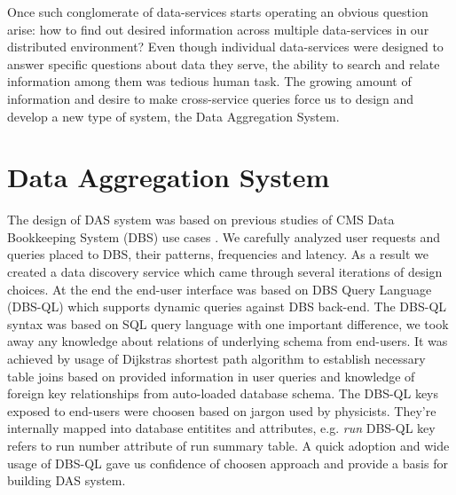 \documentclass[a4paper]{jpconf}
\begin{document}
Once such conglomerate of data-services starts operating an obvious
question arise: how to find out desired information across multiple data-services
in our distributed environment? Even though individual data-services were designed
to answer specific questions about data they serve, the ability to search and relate
information among them was tedious human task. The growing amount of information
and desire to make cross-service queries force us to design and develop a new
type of system, the Data Aggregation System.

\section{Data Aggregation System\label{DAS}}
The design of DAS system was based on previous studies of CMS Data 
Bookkeeping System (DBS) use cases \cite{DBS, DBS07}. We carefully analyzed user
requests and queries placed to DBS, their patterns, frequencies and latency. As a result
we created a data discovery service \cite{DD} which came through several iterations
of design choices. At the end the end-user interface was based on DBS 
Query Language (DBS-QL)\cite{DBS-QL} which supports dynamic queries against
DBS back-end. The DBS-QL \cite{DBS-QL} syntax was based on SQL query language with one 
important difference, we took away any knowledge about relations of underlying schema
from end-users. It was achieved by usage of Dijkstras shortest path algorithm 
to establish necessary table joins based on provided information in user queries and
knowledge of foreign key relationships from auto-loaded database schema.
The DBS-QL keys exposed to end-users were choosen based on jargon used by
physicists. They're internally mapped into database entitites and attributes, 
e.g. {\it run} DBS-QL key refers to run number attribute of run summary table.
A quick adoption and wide usage of DBS-QL gave us confidence of choosen approach 
and provide a basis for building DAS system.
\end{document}
